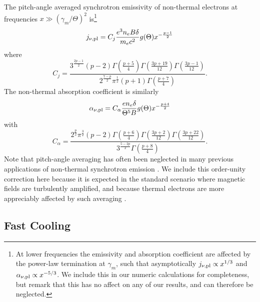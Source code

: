 \documentclass[twocolumn]{aastex63}
\begin{document}
The pitch-angle averaged synchrotron emissivity of non-thermal electrons at frequencies $x \gg (\gamma_m/\Theta)^2$ is\footnote{
At lower frequencies the emissivity and absorption coefficient are affected by the power-law termination at $\gamma_m$, such that asymptotically $j_{\nu,{\rm pl}} \propto x^{1/3}$ and $\alpha_{\nu,{\rm pl}} \propto x^{-5/3}$. We include this in our numeric calculations for completeness, but remark that this has no affect on any of our results, and can therefore be neglected.
}
\begin{equation}
\label{eq:jnu_pl}
    j_{\nu,{\rm pl}} = C_j \frac{e^3 n_e B \delta}{m_e c^2} g(\Theta) x^{-\frac{p-1}{2}} 
\end{equation}
where
\begin{equation}
    C_j = \frac{ 3^\frac{2p-1}{2} (p-2) \Gamma\left(\frac{p+5}{4}\right) \Gamma\left(\frac{3p+19}{12}\right) \Gamma\left(\frac{3p-1}{12}\right) }{ 2^\frac{7-p}{2} \pi^\frac{1}{2} (p+1) \Gamma\left(\frac{p+7}{4}\right) }
    .
\end{equation}
The non-thermal absorption coefficient is similarly
\begin{equation}
\label{eq:alphanu_pl}
    \alpha_{\nu,{\rm pl}} = C_\alpha \frac{e n_e \delta}{\Theta^5 B} g(\Theta) x^{-\frac{p+4}{2}}
\end{equation}
with 
\begin{equation}
    C_\alpha = \frac{ 2^\frac{p}{2} \pi^\frac{3}{2} (p-2) \Gamma\left(\frac{p+6}{4}\right) \Gamma\left(\frac{3p+2}{12}\right) \Gamma\left(\frac{3p+22}{12}\right) }{ 3^\frac{5-2p}{2} \Gamma\left(\frac{p+8}{4}\right) }
    .
\end{equation}
Note that pitch-angle averaging has often been neglected in many previous applications of non-thermal synchrotron emission \citep[e.g.][]{Chevalier98}. We include this order-unity correction here because it is expected in the standard scenario where magnetic fields are turbulently amplified, and because thermal electrons are more appreciably affected by such averaging \citep{Mahadevan+96}.

\subsection{Fast Cooling}
\label{sec:fast_cooling}
\end{document}
